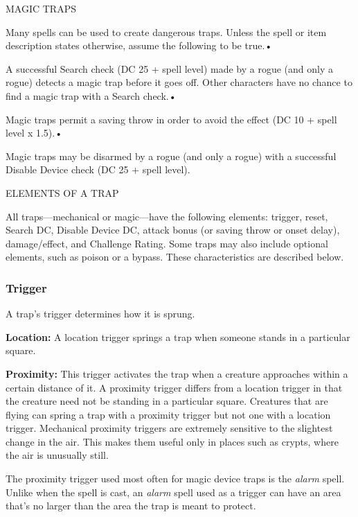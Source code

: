 \documentclass{article}
\begin{document}
\vspace{12pt}
MAGIC TRAPS

Many spells can be used to create dangerous traps. Unless the spell or item description 
states otherwise, assume the following to be true.• 

\parindent=3pt
A successful Search check (DC 25 + spell level) made by a rogue (and only a rogue) 
detects a magic trap before it goes off. Other characters have no chance to find 
a magic trap with a Search check.• 

Magic traps permit a saving throw in order to avoid the effect (DC 10 + spell level 
x $ $1.5).• 

\parindent=7pt
Magic traps may be disarmed by a rogue (and only a rogue) with a successful Disable 
Device check (DC 25 + spell level).

\vspace{12pt}
\parindent=0pt
ELEMENTS OF A TRAP

All traps---mechanical or magic---have the following elements: trigger, reset, 
Search DC, Disable Device DC, attack bonus (or saving throw or onset delay), damage/effect, 
and Challenge Rating. Some traps may also include optional elements, such as poison 
or a bypass. These characteristics are described below.

\vspace{12pt}
\subsubsection*{\textbf{Trigger}}

A trap's trigger determines how it is sprung.

\textbf{Location:} A location trigger springs a trap when someone stands in a particular 
square.

\textbf{Proximity:} This trigger activates the trap when a creature approaches 
within a certain distance of it. A proximity trigger differs from a location trigger 
in that the creature need not be standing in a particular square. Creatures that 
are flying can spring a trap with a proximity trigger but not one with a location 
trigger. Mechanical proximity triggers are extremely sensitive to the slightest 
change in the air. This makes them useful only in places such as crypts, where 
the air is unusually still.

The proximity trigger used most often for magic device traps is the \textit{alarm 
}spell. Unlike when the spell is cast, an \textit{alarm }spell used as a trigger 
can have an area that's no larger than the area the trap is meant to protect.
\end{document}

